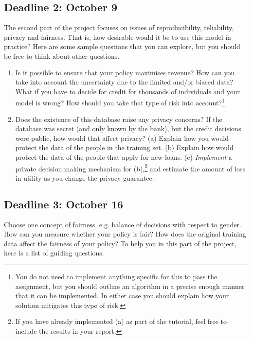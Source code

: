 \subsection{Deadline 2: October 9}
The second part of the project focuses on issues of reproducibility, reliability, privacy and fairness. That is, how desirable would it be to use this model in practice? Here are some sample questions that you can explore, but you should be free to think about other questions.
\begin{enumerate}
\item Is it possible to ensure that your policy maximises revenue? How can you take into account the uncertainty due to the limited and/or biased data? What if you have to decide for credit for thousands of individuals and your model is wrong? How should you take that type of risk into account?\footnote{You do not need to implement anything specific for this to pass the assignment, but you should outline an algorithm in a precise enough manner that it can be implemented. In either case you should explain how your solution mitigates this type of risk.}
\item Does the existence of this database raise any privacy concerns? If the database was secret (and only known by the bank), but the credit decisions were public, how would that affect privacy? (a) Explain how you would protect the data of the people in the training set. (b) Explain how would protect the data of the people that apply for new loans. (c) \emph{Implement} a private decision making mechanism for (b),\footnote{If you have already implemented (a) as part of the tutorial, feel free to include the results in your report.} and estimate the amount of loss in utility as you change the privacy guarantee.
\end{enumerate}

\subsection{Deadline 3: October 16}

 Choose one concept of fairness, e.g. balance of decisions with respect to gender. How can you measure whether your policy is fair? How does the original training data affect the fairness of your policy? To help you in this part of the project, here is a list of guiding questions.

